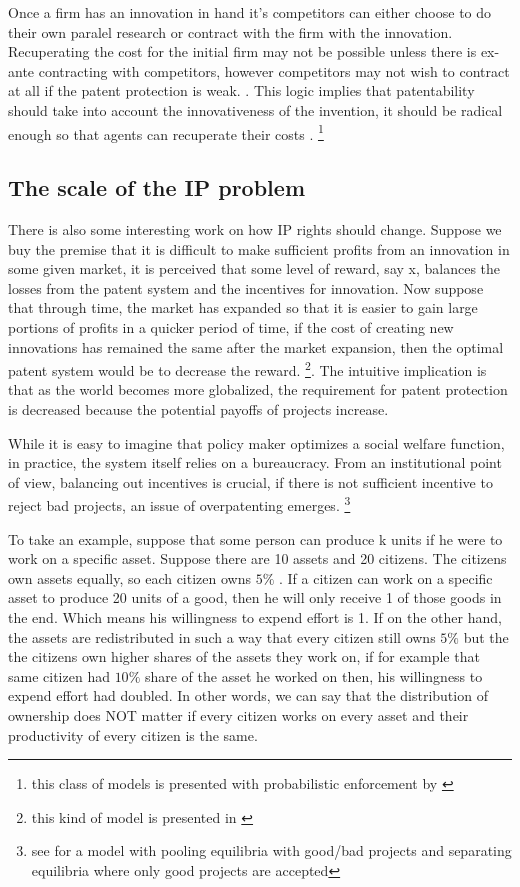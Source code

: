 \documentclass[12pt]{article}
\numberwithin{equation}{section}
\begin{document}
Once a firm has an innovation in hand it's competitors can either choose to do their own paralel research or contract with the firm with the innovation. Recuperating the cost for the initial firm may not be possible unless there is ex-ante contracting with competitors, however competitors may not wish to contract at all if the patent protection is weak. \cite{green1995division}. This logic implies that patentability should take into account the innovativeness of the invention, it should be radical enough so that agents can recuperate their costs \cite{o1998patentability}. \footnote{this class of models is presented with probabilistic enforcement by \cite{chou2007division} }

\subsection{The scale of the IP problem}

There is also some interesting work on how IP rights should change. Suppose we buy the premise that it is difficult to make sufficient profits from an innovation in some given market, it is perceived that some level of reward, say x, balances the losses from the patent system and the incentives for innovation. Now suppose that through time, the market has expanded so that it is easier to gain large portions of profits in a quicker period of time, if the cost of creating new innovations has remained the same after the market expansion, then the optimal patent system would be to decrease the reward. \footnote{this kind of model is presented in \cite{boldrin2009market} }. The intuitive implication is that as the world becomes more globalized, the requirement for patent protection is decreased because the potential payoffs of projects increase. 

While it is easy to imagine that policy maker optimizes a social welfare function, in practice, the system itself relies on a bureaucracy. From an institutional point of view, balancing out incentives is crucial, if there is not sufficient incentive to reject bad projects, an issue of overpatenting emerges. \footnote{see \cite{Caillaud2012} for a model with pooling equilibria with good/bad projects and separating equilibria where only good projects are accepted}



To take an example, suppose that some person can produce k units if he were to work on a specific asset. Suppose there are 10 assets and 20 citizens. The citizens own assets equally, so each citizen owns $5 \%$ . If a citizen can work on a specific asset to produce 20 units of a good, then he will only receive 1 of those goods in the end. Which means his willingness to expend effort is 1. If on the other hand, the assets are redistributed in such a way that every citizen still owns $5 \%$ but the the citizens own higher shares of the assets they work on, if for example that same citizen had $10\%$ share of the asset he worked on then, his willingness to expend effort had doubled. In other words, we can say that the distribution of ownership does NOT matter if every citizen works on every asset and their productivity of every citizen is the same. 
\end{document}
